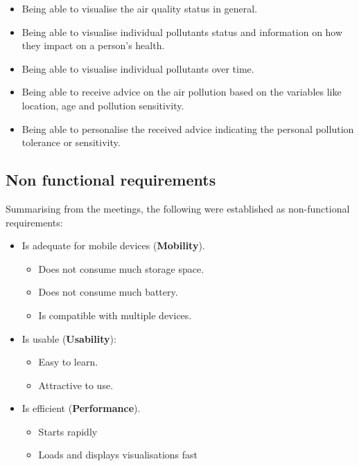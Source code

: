 \begin{itemize}
    \item Being able to visualise the air quality status in general.
    \item Being able to visualise individual pollutants status and information on how they impact on a person's health.
    \item Being able to visualise individual pollutants over time.
    \item Being able to receive advice on the air pollution based on the variables like location, age and pollution sensitivity. 
    \item Being able to personalise the received advice indicating the personal pollution tolerance or sensitivity.
\end{itemize}

\subsection{Non functional requirements}

Summarising from the meetings, the following were established as non-functional requirements:

\begin{itemize}
    \item Is adequate for mobile devices (\textbf{Mobility}).
    \begin{itemize}
        \item Does not consume much storage space.
        \item Does not consume much battery.
        \item Is compatible with multiple devices.
    \end{itemize}
    \item Is usable (\textbf{Usability}):
    \begin{itemize}
        \item Easy to learn.
        \item Attractive to use.
    \end{itemize}
    \item Is efficient (\textbf{Performance}).
    \begin{itemize}
        \item Starts rapidly
        \item Loads and displays visualisations fast
    \end{itemize}
\end{itemize}


